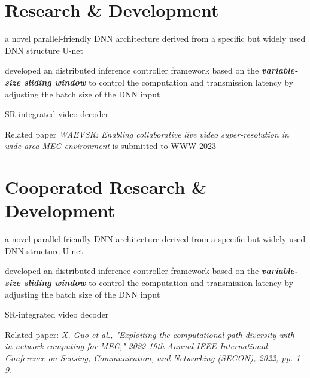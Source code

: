 \documentclass[]{deedy-resume-openfont}
\begin{document}
\begin{minipage}[t]{0.76\textwidth} 


\section{Research \& Development}
\vspace{\topsep}
\begin{tightemize}
    \item a novel parallel-friendly DNN architecture derived from a specific but widely used DNN structure U-net
    \item developed an distributed inference controller framework based on the \emph{\bfseries variable-size sliding window} to control the computation and transmission latency by adjusting the batch size of the DNN input
    \item SR-integrated video decoder
    \item Related paper \textit{WAEVSR: Enabling collaborative live video
    super‑resolution in wide‑area MEC environment} is submitted to WWW 2023
\end{tightemize}
\sectionsep


\section{Cooperated Research \& Development}
\descript{}
\begin{tightemize}
    \item a novel parallel-friendly DNN architecture derived from a specific but widely used DNN structure U-net
    \item developed an distributed inference controller framework based on the \emph{\bfseries variable-size sliding window} to control the computation and transmission latency by adjusting the batch size of the DNN input
    \item SR-integrated video decoder
    \item Related paper: \textit{X. Guo et al., "Exploiting the computational path diversity with in-network computing for MEC," 2022 19th Annual IEEE International Conference on Sensing, Communication, and Networking (SECON), 2022, pp. 1-9.}
\end{tightemize}
\sectionsep


\end{minipage}
\end{document}
